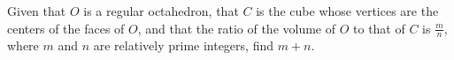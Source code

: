 Given that $O$ is a regular octahedron, that $C$ is the cube whose vertices are the centers of the faces of $O$, and that the ratio of the volume of $O$ to that of $C$ is $\frac{m}{n}$, where $m$ and $n$ are relatively prime integers, find $m+n$.
